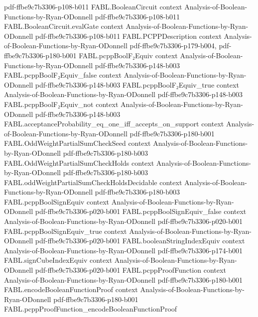 \begin{theorem}
  {pdf-ffbe9c7b3306-p108-b011}
\proofstep
  {FABL.BooleanCircuit}
  {context}
  {Analysis-of-Boolean-Functions-by-Ryan-ODonnell}
  {pdf-ffbe9c7b3306-p108-b011}
\proofstep
  {FABL.BooleanCircuit.evalGate}
  {context}
  {Analysis-of-Boolean-Functions-by-Ryan-ODonnell}
  {pdf-ffbe9c7b3306-p108-b011}
\proofstep
  {FABL.PCPPDescription}
  {context}
  {Analysis-of-Boolean-Functions-by-Ryan-ODonnell}
  {pdf-ffbe9c7b3306-p179-b004,
    pdf-ffbe9c7b3306-p180-b001}
\proofstep
  {FABL.pcppBoolF₂Equiv}
  {context}
  {Analysis-of-Boolean-Functions-by-Ryan-ODonnell}
  {pdf-ffbe9c7b3306-p148-b003}
\proofstep
  {FABL.pcppBoolF₂Equiv_false}
  {context}
  {Analysis-of-Boolean-Functions-by-Ryan-ODonnell}
  {pdf-ffbe9c7b3306-p148-b003}
\proofstep
  {FABL.pcppBoolF₂Equiv_true}
  {context}
  {Analysis-of-Boolean-Functions-by-Ryan-ODonnell}
  {pdf-ffbe9c7b3306-p148-b003}
\proofstep
  {FABL.pcppBoolF₂Equiv_not}
  {context}
  {Analysis-of-Boolean-Functions-by-Ryan-ODonnell}
  {pdf-ffbe9c7b3306-p148-b003}
\proofstep
  {FABL.acceptanceProbability_eq_one_iff_accepts_on_support}
  {context}
  {Analysis-of-Boolean-Functions-by-Ryan-ODonnell}
  {pdf-ffbe9c7b3306-p180-b001}
\proofstep
  {FABL.OddWeightPartialSumCheckSeed}
  {context}
  {Analysis-of-Boolean-Functions-by-Ryan-ODonnell}
  {pdf-ffbe9c7b3306-p180-b003}
\proofstep
  {FABL.OddWeightPartialSumCheckHolds}
  {context}
  {Analysis-of-Boolean-Functions-by-Ryan-ODonnell}
  {pdf-ffbe9c7b3306-p180-b003}
\proofstep
  {FABL.oddWeightPartialSumCheckHoldsDecidable}
  {context}
  {Analysis-of-Boolean-Functions-by-Ryan-ODonnell}
  {pdf-ffbe9c7b3306-p180-b003}
\proofstep
  {FABL.pcppBoolSignEquiv}
  {context}
  {Analysis-of-Boolean-Functions-by-Ryan-ODonnell}
  {pdf-ffbe9c7b3306-p020-b001}
\proofstep
  {FABL.pcppBoolSignEquiv_false}
  {context}
  {Analysis-of-Boolean-Functions-by-Ryan-ODonnell}
  {pdf-ffbe9c7b3306-p020-b001}
\proofstep
  {FABL.pcppBoolSignEquiv_true}
  {context}
  {Analysis-of-Boolean-Functions-by-Ryan-ODonnell}
  {pdf-ffbe9c7b3306-p020-b001}
\proofstep
  {FABL.booleanStringIndexEquiv}
  {context}
  {Analysis-of-Boolean-Functions-by-Ryan-ODonnell}
  {pdf-ffbe9c7b3306-p174-b001}
\proofstep
  {FABL.signCubeIndexEquiv}
  {context}
  {Analysis-of-Boolean-Functions-by-Ryan-ODonnell}
  {pdf-ffbe9c7b3306-p020-b001}
\proofstep
  {FABL.pcppProofFunction}
  {context}
  {Analysis-of-Boolean-Functions-by-Ryan-ODonnell}
  {pdf-ffbe9c7b3306-p180-b001}
\proofstep
  {FABL.encodeBooleanFunctionProof}
  {context}
  {Analysis-of-Boolean-Functions-by-Ryan-ODonnell}
  {pdf-ffbe9c7b3306-p180-b001}
\proofstep
  {FABL.pcppProofFunction_encodeBooleanFunctionProof}

\end{theorem}
